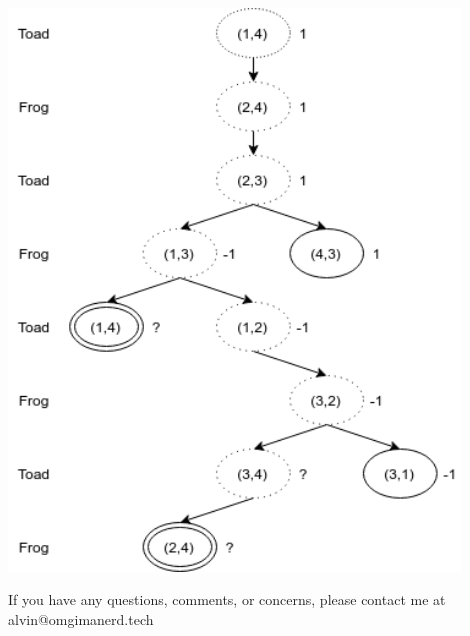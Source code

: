 \documentclass{math}
\begin{document}
\begin{center}
  \includegraphics[width=12cm]{assets/frog_toad_diagram.png}
\end{center}

\begin{center}
  If you have any questions, comments, or concerns, please contact me at
  alvin@omgimanerd.tech
\end{center}
\end{document}

